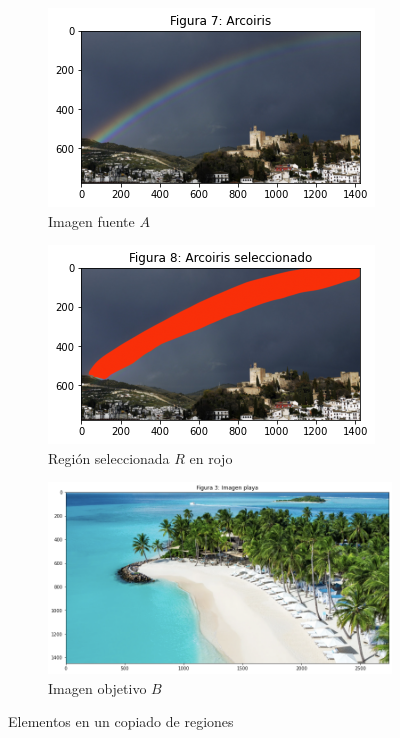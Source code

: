 \documentclass[11pt,twoside,titlepage,a4paper]{article}
\numberwithin{equation}{section} %
\theoremstyle{usual}
\begin{document}
\begin{figure}[h]
    \centering
    \begin{subfigure}[b]{0.3\textwidth}
        \includegraphics[width=\textwidth]{imagenes/PoissonImageEditing_cell_12_output_0.png}
        \caption{Imagen fuente $A$}
    \end{subfigure}
    \begin{subfigure}[b]{0.35\textwidth}
        \includegraphics[width=\textwidth]{imagenes/PoissonImageEditing_cell_12_output_1.png}
        \caption{Región seleccionada $R$ en rojo}
    \end{subfigure}
    \begin{subfigure}[b]{0.3\textwidth}
       \centering
        \includegraphics[width=\textwidth]{imagenes/PoissonImageEditing_cell_8_output_3.png}
        \caption{Imagen objetivo $B$}
    \end{subfigure}
    \caption{Elementos en un copiado de regiones}
    \label{fig:copiadoRegionesConexasArcoirisPlaya}
\end{figure}
\end{document}
